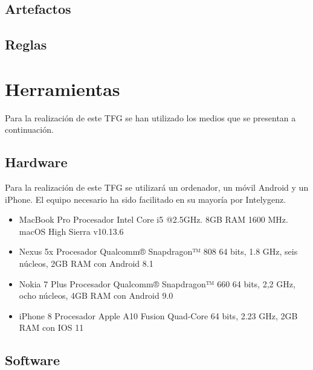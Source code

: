 \subsection{Artefactos}

\subsection{Reglas}


\section{Herramientas}

Para la realización de este \acs{TFG} se han utilizado los medios que se presentan a continuación.

\subsection{Hardware}

Para la realización de este TFG se utilizará un ordenador, un móvil Android y un iPhone. El equipo 
necesario ha sido facilitado en su mayoría por Intelygenz.

\begin{itemize}
	\item MacBook Pro Procesador Intel Core i5 @2.5GHz. 8GB RAM 1600 MHz. macOS High Sierra v10.13.6
	\item Nexus 5x Procesador Qualcomm® Snapdragon™ 808 64 bits, 1.8 GHz, seis núcleos, 2GB RAM con Android 8.1
	\item Nokia 7 Plus Procesador Qualcomm® Snapdragon™ 660 64 bits, 2,2 GHz, ocho núcleos, 4GB RAM con Android 9.0
	\item iPhone 8 Procesador Apple A10 Fusion Quad-Core 64 bits, 2.23 GHz, 2GB RAM con IOS 11
\end{itemize}

\subsection{Software}

